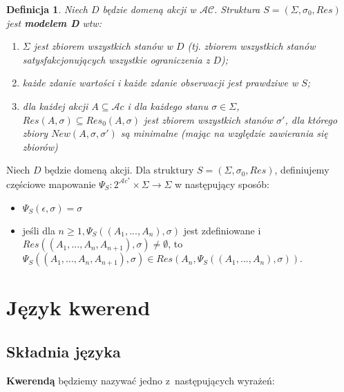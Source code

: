 \documentclass[11pt,a4paper]{article}
\newtheorem{defn}{Definicja}
\begin{document}

\begin{defn}

Niech $D$ będzie domeną akcji w $\mathcal{AC}$. Struktura $S = (\Sigma,\sigma_0,Res)$ jest \textbf{modelem D} wtw:
\begin{enumerate}
\item $\Sigma$ jest zbiorem wszystkich stanów w $D$ (tj. zbiorem wszystkich stanów satysfakcjonujących wszystkie ograniczenia z $D$);
\item każde zdanie wartości i każde zdanie obserwacji jest prawdziwe w $S$;
\item dla każdej akcji $A \subseteq \mathcal{A}c$ i dla każdego stanu $\sigma \in \Sigma$, $Res(A,\sigma) \subseteq Res_0(A,\sigma)$ jest zbiorem wszystkich stanów $\sigma'$, dla którego zbiory $New(A,\sigma,\sigma')$ są minimalne (mając na względzie zawierania się zbiorów)
\end{enumerate}
\end{defn}


Niech $D$ będzie domeną akcji. Dla struktury $S = (\Sigma,\sigma_0,Res)$, definiujemy częściowe mapowanie 
$\Psi_S : 2^{\mathcal{A}c^*} \times \Sigma \rightarrow \Sigma$ w następujący sposób:
\begin{itemize}
\item $\Psi_S(\epsilon,\sigma) = \sigma$
\item jeśli dla $n \geq 1, \Psi_S((A_1,...,A_n),\sigma)$ jest zdefiniowane i $Res((A_1,...,A_n,A_{n+1}),\sigma) \neq \emptyset$, to $\Psi_S((A_1,...,A_n,A_{n+1}),\sigma) \in Res(A_n,\Psi_S((A_1,...,A_n),\sigma)).$
\end{itemize}

\section{Język kwerend}

\subsection{Składnia języka}

    \textbf{Kwerendą} będziemy nazywać jedno z~następujących wyrażeń:
\end{document}
